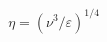 \documentclass[preview]{standalone}
\begin{document}
\begin{align*}
\eta = (\nu^3 / \varepsilon)^{1/4}
\end{align*}
\end{document}
